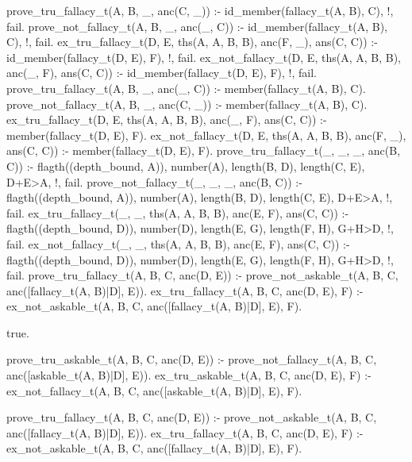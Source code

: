 prove_tru_fallacy_t(A, B, _, anc(C, _)) :-
        id_member(fallacy_t(A, B), C), !,
        fail.
prove_not_fallacy_t(A, B, _, anc(_, C)) :-
        id_member(fallacy_t(A, B), C), !,
        fail.
ex_tru_fallacy_t(D, E, ths(A, A, B, B), anc(F, _), ans(C, C)) :-
        id_member(fallacy_t(D, E), F), !,
        fail.
ex_not_fallacy_t(D, E, ths(A, A, B, B), anc(_, F), ans(C, C)) :-
        id_member(fallacy_t(D, E), F), !,
        fail.
prove_tru_fallacy_t(A, B, _, anc(_, C)) :-
        member(fallacy_t(A, B), C).
prove_not_fallacy_t(A, B, _, anc(C, _)) :-
        member(fallacy_t(A, B), C).
ex_tru_fallacy_t(D, E, ths(A, A, B, B), anc(_, F), ans(C, C)) :-
        member(fallacy_t(D, E), F).
ex_not_fallacy_t(D, E, ths(A, A, B, B), anc(F, _), ans(C, C)) :-
        member(fallacy_t(D, E), F).
prove_tru_fallacy_t(_, _, _, anc(B, C)) :-
        flagth((depth_bound, A)),
        number(A),
        length(B, D),
        length(C, E),
        D+E>A, !,
        fail.
prove_not_fallacy_t(_, _, _, anc(B, C)) :-
        flagth((depth_bound, A)),
        number(A),
        length(B, D),
        length(C, E),
        D+E>A, !,
        fail.
ex_tru_fallacy_t(_, _, ths(A, A, B, B), anc(E, F), ans(C, C)) :-
        flagth((depth_bound, D)),
        number(D),
        length(E, G),
        length(F, H),
        G+H>D, !,
        fail.
ex_not_fallacy_t(_, _, ths(A, A, B, B), anc(E, F), ans(C, C)) :-
        flagth((depth_bound, D)),
        number(D),
        length(E, G),
        length(F, H),
        G+H>D, !,
        fail.
prove_tru_fallacy_t(A, B, C, anc(D, E)) :-
        prove_not_askable_t(A,
                            B,
                            C,
                            anc([fallacy_t(A, B)|D], E)).
ex_tru_fallacy_t(A, B, C, anc(D, E), F) :-
        ex_not_askable_t(A,
                         B,
                         C,
                         anc([fallacy_t(A, B)|D], E),
                         F).



true.


prove_tru_askable_t(A, B, C, anc(D, E)) :-
        prove_not_fallacy_t(A,
                            B,
                            C,
                            anc([askable_t(A, B)|D], E)).
ex_tru_askable_t(A, B, C, anc(D, E), F) :-
        ex_not_fallacy_t(A,
                         B,
                         C,
                         anc([askable_t(A, B)|D], E),
                         F).


prove_tru_fallacy_t(A, B, C, anc(D, E)) :-
        prove_not_askable_t(A,
                            B,
                            C,
                            anc([fallacy_t(A, B)|D], E)).
ex_tru_fallacy_t(A, B, C, anc(D, E), F) :-
        ex_not_askable_t(A,
                         B,
                         C,
                         anc([fallacy_t(A, B)|D], E),
                         F).










